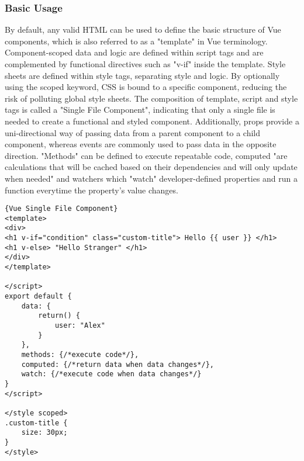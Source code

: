 \subsubsection{Basic Usage}
 By default, any valid HTML can be used to define the basic structure of Vue components, which is also referred to as a "template" in Vue terminology. Component-scoped data and logic are defined within script tags and are complemented by functional directives such as "v-if" inside the template. Style sheets are defined within style tags, separating style and logic. By optionally using the scoped keyword, CSS is bound to a specific component, reducing the risk of polluting global style sheets. The composition of template, script and style tags is called a "Single File Component", indicating that only a single file is needed to create a functional and styled component. Additionally, props provide a uni-directional way of passing data from a parent component to a child component, whereas events are commonly used to pass data in the opposite direction. "Methods" can be defined to execute repeatable code, \gls{computed} "are calculations that will be cached based on their dependencies and will only update when needed" \cite{filipova2016learning} and \gls{watchers} which "watch" developer-defined properties and run a function everytime the property's value changes. \newline

\begin{lstlisting}[caption=Vue Single File Component, captionpos=b, style=htmlcssjs]{Vue Single File Component}
<template>
<div>
<h1 v-if="condition" class="custom-title"> Hello {{ user }} </h1>
<h1 v-else> "Hello Stranger" </h1>
</div>
</template>

</script>
export default {
    data: {
        return() {
            user: "Alex"
        }
    },
    methods: {/*execute code*/},
    computed: {/*return data when data changes*/},
    watch: {/*execute code when data changes*/}
}
</script>

</style scoped>
.custom-title {
    size: 30px;
}
</style>
\end{lstlisting}

